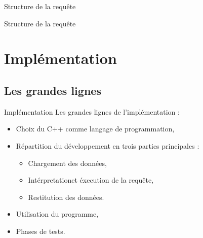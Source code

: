 \documentclass[10pt,handout]{beamer}
\newif\ifplacelogo %
\begin{document}
\placelogofalse
\begin{frame}{Structure de la requête}
\end{frame}
\placelogotrue

\begin{frame}{Structure de la requête}

\end{frame}

\section{Implémentation}

\subsection{Les grandes lignes}

\begin{frame}{Implémentation}
  Les grandes lignes de l'implémentation :
  \begin{itemize}
    \item Choix du C++ comme langage de programmation,
    \item Répartition du développement en trois parties principales :
    \begin{itemize}
      \item Chargement des données,
      \item Intérpretationet éxecution de la requête,
      \item Restitution des données.
    \end{itemize}
    \item Utilisation du programme,
    \item Phases de tests.
  \end{itemize}
\end{frame}
\end{document}
